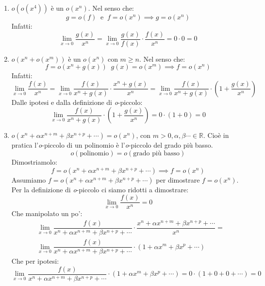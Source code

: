 \begin{enumerate}
	\item $o(o(x^4))$ è un $o(x^n)$. Nel senso che:
		\begin{equation*}
			g = o(f) \;\; \text{e} \;\; f = o(x^n) \implies g = o(x^n)
		\end{equation*}
		Infatti:
		\begin{equation*}
			\lim_{x \to 0} \dfrac{g(x)}{x^n} = \lim_{x \to 0} \dfrac{g(x)}{f(x)} \cdot \dfrac{f(x)}{x^n} = 0 \cdot 0 = 0
		\end{equation*}

	\item $o(x^n + o(x^m))$ è un $o(x^n)$ con $m \geq n$. Nel senso che:
		\begin{equation*}
			f = o(x^n + g(x)) \;\; g(x) = o(x^m) \implies f = o(x^n)
		\end{equation*}
		Infatti:
		\begin{equation*}
			\lim_{x \to 0} \dfrac{f(x)}{x^n} = \lim_{x \to 0} \dfrac{f(x)}{x^n + g(x)} \cdot \dfrac{x^n + g(x)}{x^n} = \lim_{x \to 0} \dfrac{f(x)}{x^n + g(x)} \cdot \left(1 + \dfrac{g(x)}{x^n}\right)
		\end{equation*}
		Dalle ipotesi e dalla definizione di \textit{o}-piccolo:
		\begin{equation*}
			\lim_{x \to 0} \dfrac{f(x)}{x^n + g(x)} \cdot \left(1 + \dfrac{g(x)}{x^n}\right) = 0 \cdot (1 + 0) = 0
		\end{equation*}

	\item $o(x^n + \alpha x^{n+m} + \beta x^{n + p} + \cdots) = o(x^n)$, con $m > 0, \alpha, \beta \cdots \in \mathbb{R}$. Cioè in pratica l'\textit{o}-piccolo di un polinomio è l'\textit{o}-piccolo del grado più basso.
		\begin{equation*}
			o(\text{polinomio}) = o(\text{grado più basso})
		\end{equation*}
		Dimostriamolo:
		\begin{equation*}
			f = o(x^n + \alpha x^{n+m} + \beta x^{n + p} + \cdots) \implies f = o(x^n)
		\end{equation*}
		Assumiamo $f = o(x^n + \alpha x^{n+m} + \beta x^{n + p} + \cdots)$ per dimostrare $f = o(x^n)$. Per la definizione di \textit{o}-piccolo ci siamo ridotti a dimostrare:
		\begin{equation*}
			\lim_{x \to 0} \dfrac{f(x)}{x^n} = 0
		\end{equation*}
		Che manipolato un po':
		\begin{align*}
			&\lim_{x \to 0} \dfrac{f(x)}{x^n + \alpha x^{n+m} + \beta x^{n + p} + \cdots} \cdot \dfrac{x^n + \alpha x^{n+m} + \beta x^{n + p} + \cdots}{x^n} =\\[10pt]
			&\lim_{x \to 0} \dfrac{f(x)}{x^n + \alpha x^{n+m} + \beta x^{n + p} + \cdots} \cdot (1 + \alpha x^{m} + \beta x^{p} + \cdots)
		\end{align*}
		Che per ipotesi:
		\begin{equation*}
			\lim_{x \to 0} \dfrac{f(x)}{x^n + \alpha x^{n+m} + \beta x^{n + p} + \cdots} \cdot (1 + \alpha x^{m} + \beta x^{p} + \cdots) = 0 \cdot (1 + 0 + 0 + \cdots) = 0
		\end{equation*}


\end{enumerate}
